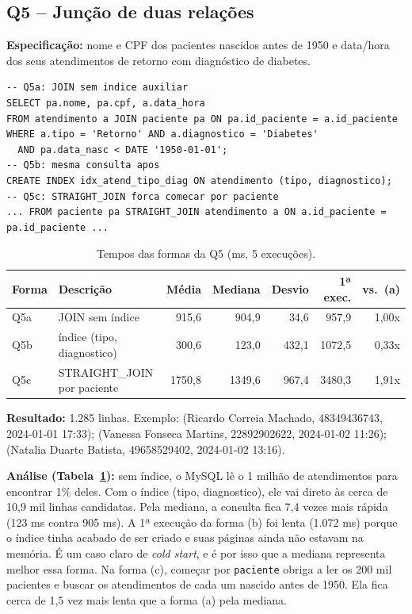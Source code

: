 \documentclass[10pt,a4paper]{article}
\begin{document}
\subsection{Q5 -- Junção de duas relações}
\textbf{Especificação:} nome e CPF dos pacientes nascidos antes de 1950 e data/hora dos seus atendimentos de retorno com diagnóstico de diabetes.

\begin{lstlisting}
-- Q5a: JOIN sem indice auxiliar
SELECT pa.nome, pa.cpf, a.data_hora
FROM atendimento a JOIN paciente pa ON pa.id_paciente = a.id_paciente
WHERE a.tipo = 'Retorno' AND a.diagnostico = 'Diabetes'
  AND pa.data_nasc < DATE '1950-01-01';
-- Q5b: mesma consulta apos
CREATE INDEX idx_atend_tipo_diag ON atendimento (tipo, diagnostico);
-- Q5c: STRAIGHT_JOIN forca comecar por paciente
... FROM paciente pa STRAIGHT_JOIN atendimento a ON a.id_paciente = pa.id_paciente ...
\end{lstlisting}

\begin{table}[H]\centering\footnotesize
\caption{Tempos das formas da Q5 (ms, 5 execuções).}\label{tab:q5}
\begin{tabular}{llrrrrr}\toprule
Forma & Descrição & Média & Mediana & Desvio & 1ª exec. & vs.\ (a) \\ \midrule
Q5a & JOIN sem índice              &  915,6 &  904,9 &  34,6 &  957,9 & 1,00x \\
Q5b & índice (tipo, diagnostico)   &  300,6 &  123,0 & 432,1 & 1072,5 & 0,33x \\
Q5c & STRAIGHT\_JOIN por paciente  & 1750,8 & 1349,6 & 967,4 & 3480,3 & 1,91x \\ \bottomrule
\end{tabular}
\end{table}

\textbf{Resultado:} 1.285 linhas. Exemplo: (Ricardo Correia Machado, 48349436743, 2024-01-01 17:33); (Vanessa Fonseca Martins, 22892902622, 2024-01-02 11:26); (Natalia Duarte Batista, 49658529402, 2024-01-02 13:16).

\textbf{Análise (Tabela~\ref{tab:q5}):} sem índice, o MySQL lê o 1 milhão de atendimentos para encontrar 1\% deles. Com o índice (tipo, diagnostico), ele vai direto às cerca de 10,9 mil linhas candidatas. Pela mediana, a consulta fica 7,4 vezes mais rápida (123 ms contra 905 ms). A 1ª execução da forma (b) foi lenta (1.072 ms) porque o índice tinha acabado de ser criado e suas páginas ainda não estavam na memória. É um caso claro de \emph{cold start}, e é por isso que a mediana representa melhor essa forma. Na forma (c), começar por \texttt{paciente} obriga a ler os 200 mil pacientes e buscar os atendimentos de cada um nascido antes de 1950. Ela fica cerca de 1,5 vez mais lenta que a forma (a) pela mediana.
\end{document}
